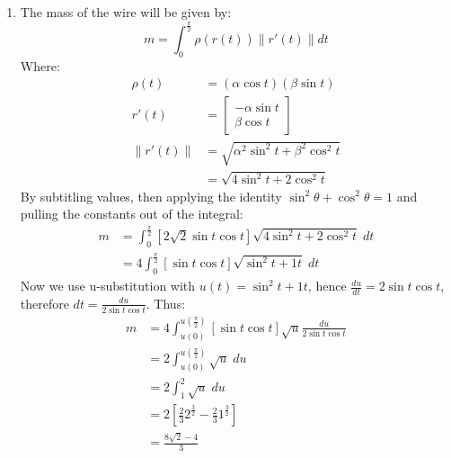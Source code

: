 \documentclass[a4paper, 11pt]{article}
\def\set#1{\left\{ #1 \right\}}
\begin{document}
\begin{enumerate}[label=(\alph*)]
  \item The mass of the wire will be given by:
        $$m = \int_0^{\frac{\pi}2}\rho(r(t))\|r'(t)\|dt$$
        Where:
        \begin{align*}
          \rho(t)   & =\left( \alpha\cos t \right)\left( \beta\sin t  \right) \\
          r'(t)     & = \begin{bmatrix}
                          -\alpha\sin t \\
                          \beta \cos t
                        \end{bmatrix}                                        \\
          \|r'(t)\| & = \sqrt{\alpha^2\sin^2t + \beta^2\cos^2 t}              \\
                    & =\sqrt{4\sin^2t + 2\cos^2 t}
        \end{align*}
        By subtitling values, then applying the identity $\sin^2\theta+\cos^2\theta=1$ and pulling the constants out of the integral:
        \begin{align*}
          m & = \int_0^{\frac{\pi}2} \left[ 2\sqrt 2\sin t \cos t  \right]\sqrt{4\sin^2t + 2\cos^2 t}\;dt \\
            & =4 \int_0^{\frac{\pi}2} \left[ \sin t \cos t  \right]\sqrt{\sin^2t + 1 t}\;dt
        \end{align*}
        Now we use u-substitution with $u(t)=\sin^2t + 1 t$, hence $\frac{du}{dt} = 2\sin t \cos t$, therefore $dt= \frac{du}{2\sin t \cos t}$. Thus:
        \begin{align*}
          m & = 4 \int_{u(0)}^{u(\frac{\pi}2)} \left[ \sin t \cos t  \right]\sqrt{u}\frac{du}{2\sin t\cos t } \\
            & = 2\int_{u(0)}^{u(\frac{\pi}2)}\sqrt{u}\;du                                                     \\
            & = 2\int_1^2 \sqrt u \; du                                                                       \\
            & = 2\left[  \frac 23 2^{\frac 32} - \frac 23 1^{\frac 32}             \right]                    \\
            & = \frac  { 8\sqrt{2} - 4 }3                                                                     \\
        \end{align*}

\end{enumerate}

\end{document}

